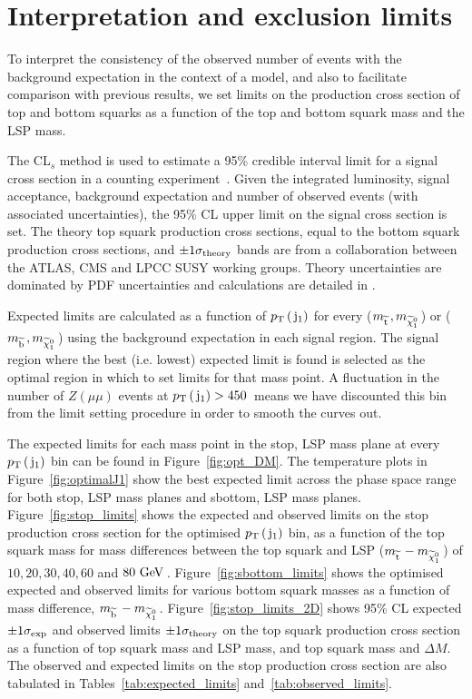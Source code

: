 \section{Interpretation and exclusion limits}
\label{sec:STAT}

To interpret the consistency of the observed number of events with
the background expectation in the context of a model, and also to
facilitate comparison with previous results, we set limits on the production cross section of top and bottom squarks as a function of the top and bottom squark mass and the LSP mass. 


The CL$_{s}$ method is used to estimate a 95\% credible interval limit for a signal cross section in a counting experiment~\cite{bib:STAT_RooStats,bib:BKG_PDG}.
Given the integrated luminosity, signal acceptance, background expectation and number of observed events (with associated uncertainties),
the 95\% CL upper limit on the signal cross section is set.
The theory top squark production cross sections, equal to the bottom squark production cross sections, and $\pm1\sigma_{\rm theory}$ bands are from a collaboration between the ATLAS, CMS
and LPCC SUSY working groups. Theory uncertainties are dominated by PDF uncertainties 
and calculations are detailed in \cite{bib:SUSYxs}. 

Expected limits are calculated as a function of $p_{\text{T}}\,(\,\mathrm{j}_1)$ for every ($m_{\widetilde{{\rm t}}\,}, m_{\widetilde{\chi}^{0}_{1}\,}$) or ($m_{\widetilde{{\rm b}}\,}, m_{\widetilde{\chi}^{0}_{1}\,}$) using the background expectation in each signal region. 
The signal region where the best (i.e. lowest) expected limit is found is selected as the optimal region in which to set limits for that mass point.
A fluctuation in the number of $Z(\mu\mu)$ events at $p_{\text{T}}\,(\,\mathrm{j}_1)>450$~\GeV means we have discounted this bin from the limit setting procedure in order to smooth 
the curves out.

The expected limits for each mass point in the stop, LSP mass plane at every $p_{\text{T}}\,(\,\mathrm{j}_1)$ bin can be found in Figure~\ref{fig:opt_DM}. 
The temperature plots in Figure~\ref{fig:optimalJ1} show the best expected limit across the phase space range for both stop, LSP mass planes and sbottom, LSP mass planes. 
%
Figure~\ref{fig:stop_limits} shows the expected and observed limits on the stop production cross section for the optimised $p_{\text{T}}\,(\,\mathrm{j}_1)$ bin, 
as a function of the top squark mass for mass differences between the top squark and LSP ($m_{\widetilde{{\rm t}}\,} - m_{\widetilde{\chi}^{0}_{1}\,}$) 
of $10, 20, 30, 40, 60$ and  $80~\mathrm{GeV}\,$. 
Figure~\ref{fig:sbottom_limits} shows the optimised expected and observed limits for various bottom squark masses as a function of mass difference, $m_{\widetilde{{\rm b}}\,} - m_{\widetilde{\chi}^{0}_{1}\,}$.
Figure~\ref{fig:stop_limits_2D} shows 95\% CL expected $\pm 1 \sigma_{\rm exp}$ and observed limits $\pm 1 \sigma_{\rm theory}$ on the top squark production cross section 
as a function of top squark mass and LSP mass, and top squark mass and $\Delta M$. 
The observed and expected limits on the stop production cross section are also tabulated in Tables~\ref{tab:expected_limits} and~\ref{tab:observed_limits}. 

